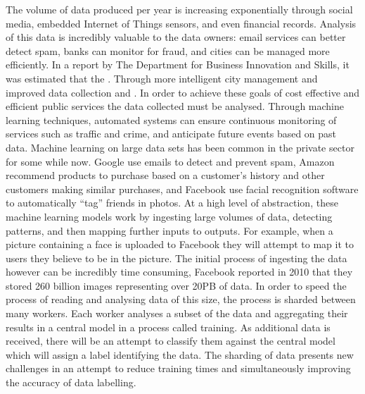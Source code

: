 \documentclass[12pt]{article}
\begin{document}
The volume of data produced per year is increasing exponentially through social media, embedded Internet of Things sensors, and even financial records. Analysis of this data is incredibly valuable to the data owners: email services can better detect spam, banks can monitor for fraud, and cities can be managed more efficiently.
\newline
\newline
In a report by The Department for Business Innovation and Skills\cite{smartCities}, it was estimated that the . Through more intelligent city management and improved data collection  and .
\newline
\newline
In order to achieve these goals of cost effective and efficient public services the data collected must be analysed. Through machine learning techniques, automated systems can ensure continuous monitoring of services such as traffic and crime, and anticipate future events based on past data.
\newline
\newline
Machine learning on large data sets has been common in the private sector for some while now. Google use emails to detect and prevent spam, Amazon recommend products to purchase based on a customer's history and other customers making similar purchases, and Facebook use facial recognition software to automatically ``tag'' friends in photos.
\newline
\newline
At a high level of abstraction, these machine learning models work by ingesting large volumes of data, detecting patterns, and then mapping further inputs to outputs. For example, when a picture containing a face is uploaded to Facebook they will attempt to map it to users they believe to be in the picture. The initial process of ingesting the data however can be incredibly time consuming, Facebook reported in 2010\cite{facebookHaystack} that they stored 260 billion images representing over 20PB of data.
\newline
\newline
In order to speed the process of reading and analysing data of this size, the process is sharded between many workers. Each worker analyses a subset of the data and aggregating their results in a central model in a process called training. As additional data is received, there will be an attempt to classify them against the central model which will assign a label identifying the data. The sharding of data presents new challenges in an attempt to reduce training times and simultaneously improving the accuracy of data labelling.
\end{document}
